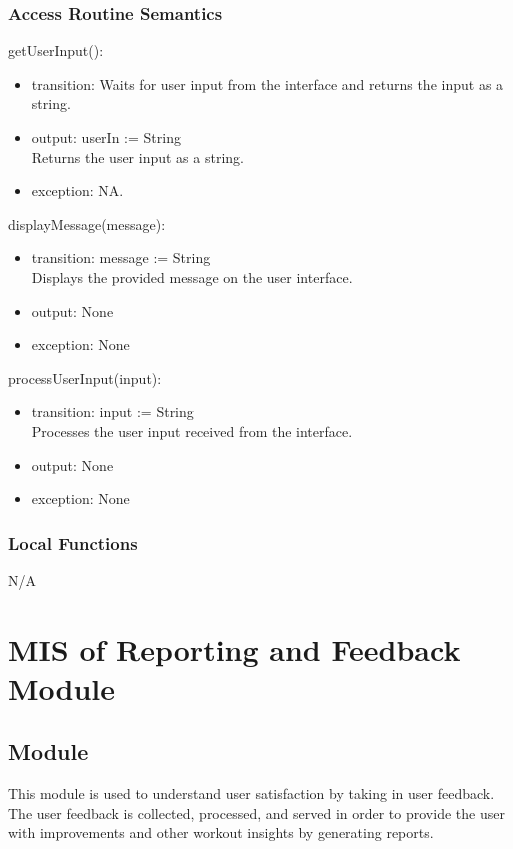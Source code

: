 \documentclass[12pt, titlepage]{article}
\begin{document}
\subsubsection{Access Routine Semantics}

\noindent getUserInput():
\begin{itemize}
\item transition: Waits for user input from the interface and returns the input as a string.
\item output: userIn := String \\
Returns the user input as a string.
\item exception: NA.
\end{itemize}

\noindent displayMessage(message):
\begin{itemize}
\item transition: message := String \\
Displays the provided message on the user interface.
\item output:  None
\item exception:  None
\end{itemize}

\noindent processUserInput(input):
\begin{itemize}
\item transition: input := String \\
Processes the user input received from the interface.
\item output:  None
\item exception:  None
\end{itemize}


\subsubsection{Local Functions}
N/A

\section{MIS of Reporting and Feedback Module}

\subsection{Module}
This module is used to understand user satisfaction by taking in user feedback. The user feedback is collected, processed, and served in order to provide the user with improvements and other workout insights by generating reports. 
\end{document}
